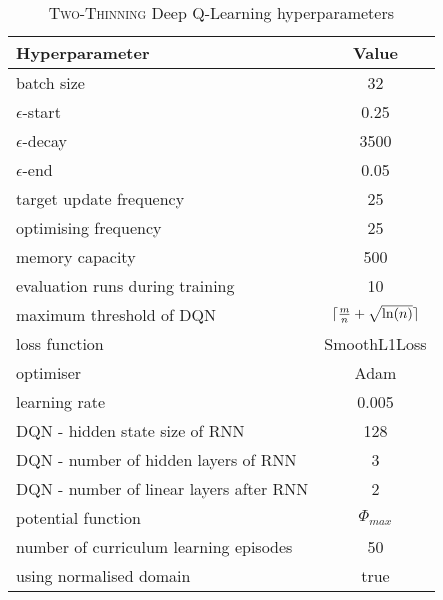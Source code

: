 \begin{table}[ht]
\centering
\begin{threeparttable}
\centering
\begin{tabular}{l|c}
\toprule
Hyperparameter             &     Value \\
\midrule
batch size               &     32 \\ 
$\epsilon$-start               &    0.25 \\ 
$\epsilon$-decay         &     3500\\
$\epsilon$-end              &     0.05 \\
target update frequency               &     25 \\ 
optimising frequency          &     25 \\ 
memory capacity     &     500 \\
evaluation runs during training             &     10 \\
maximum threshold of DQN             &     $\lceil\frac{m}{n}+\sqrt{\ln(n)}\rceil$ \\ 
loss function               &     SmoothL1Loss \\ 
optimiser        &     Adam \\
learning rate             &     0.005 \\
DQN - hidden state size of RNN               &     128 \\ 
DQN - number of hidden layers of RNN         &     3 \\ 
DQN - number of linear layers after RNN     &     2 \\
potential function            &    $\Phi_{max}$ \\
number of curriculum learning episodes            & 50 \\ 
using normalised domain               &     true \\ 
\bottomrule
\end{tabular}
\end{threeparttable}
\caption{\textsc{Two-Thinning} Deep Q-Learning hyperparameters}
\label{tab:two-thinning-hyperparameters}
\end{table}



